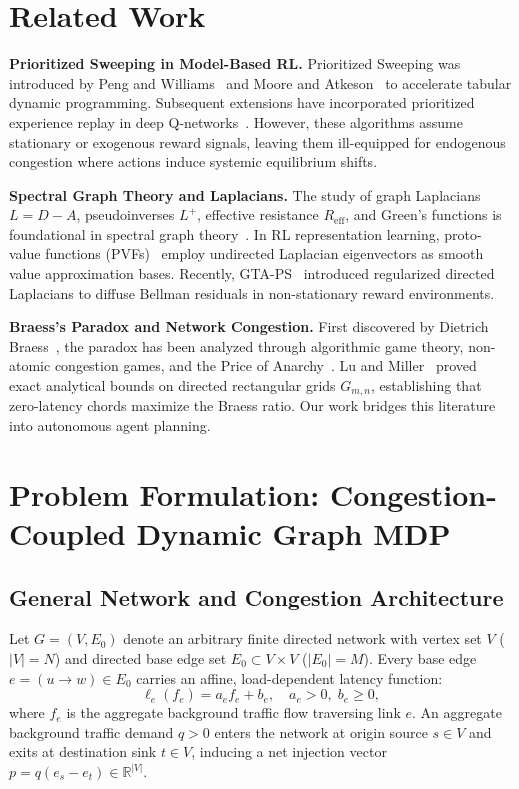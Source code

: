\documentclass[11pt,a4paper]{article}
\begin{document}
\section{Related Work}
\label{sec:related}

\textbf{Prioritized Sweeping in Model-Based RL.}
Prioritized Sweeping was introduced by Peng and Williams~\cite{peng1993efficient} and Moore and Atkeson~\cite{moore1993prioritized} to accelerate tabular dynamic programming. Subsequent extensions have incorporated prioritized experience replay in deep Q-networks~\cite{schaul2015prioritized}. However, these algorithms assume stationary or exogenous reward signals, leaving them ill-equipped for endogenous congestion where actions induce systemic equilibrium shifts.

\textbf{Spectral Graph Theory and Laplacians.}
The study of graph Laplacians $L = D - A$, pseudoinverses $L^+$, effective resistance $R_{\text{eff}}$, and Green's functions is foundational in spectral graph theory~\cite{spielman2025sagt}. In RL representation learning, proto-value functions (PVFs)~\cite{mahadevan2007proto} employ undirected Laplacian eigenvectors as smooth value approximation bases. Recently, GTA-PS~\cite{gta_ps2025} introduced regularized directed Laplacians to diffuse Bellman residuals in non-stationary reward environments.

\textbf{Braess's Paradox and Network Congestion.}
First discovered by Dietrich Braess~\cite{braess1968paradoxon}, the paradox has been analyzed through algorithmic game theory, non-atomic congestion games, and the Price of Anarchy~\cite{roughgarden2002bad}. Lu and Miller~\cite{lu2026braess} proved exact analytical bounds on directed rectangular grids $G_{m,n}$, establishing that zero-latency chords maximize the Braess ratio. Our work bridges this literature into autonomous agent planning.

\section{Problem Formulation: Congestion-Coupled Dynamic Graph MDP}
\label{sec:formulation}

\subsection{General Network and Congestion Architecture}
Let $G = (V, E_0)$ denote an arbitrary finite directed network with vertex set $V$ ($|V| = N$) and directed base edge set $E_0 \subset V \times V$ ($|E_0| = M$). Every base edge $e = (u \to w) \in E_0$ carries an affine, load-dependent latency function:
\begin{equation}
\ell_e(f_e) = a_e f_e + b_e, \quad a_e > 0, \; b_e \ge 0,
\end{equation}
where $f_e$ is the aggregate background traffic flow traversing link $e$. An aggregate background traffic demand $q > 0$ enters the network at origin source $s \in V$ and exits at destination sink $t \in V$, inducing a net injection vector $p = q (e_s - e_t) \in \mathbb{R}^{|V|}$.
\end{document}
